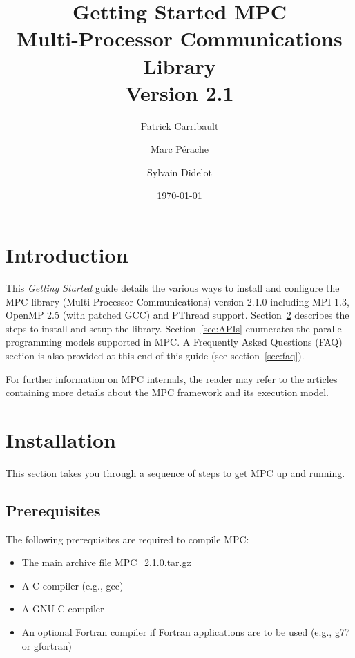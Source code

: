\documentclass[a4paper,11pt]{article}
\title{Getting Started MPC\\Multi-Processor Communications Library\\Version 2.1}
\author{Patrick Carribault \and Marc P\'{e}rache \and Sylvain Didelot}
\date{\today}
\def\MPCVERSION{2.1.0}
\begin{document}
\maketitle
\tableofcontents

\section{Introduction}
This \textit{Getting Started} guide details the various ways to install and configure the MPC library
(Multi-Processor Communications) version {\MPCVERSION} including MPI 1.3, OpenMP 2.5 (with patched GCC) and PThread support.
Section~\ref{sec:installation} describes the steps to install and setup the library.
Section~\ref{sec:APIs} enumerates the parallel-programming models supported in MPC.
A Frequently Asked Questions (FAQ) section is also provided at this end of this guide (see section~\ref{sec:faq}).

For further information on MPC internals, the reader may refer to the
articles~\cite{Perache08,Perache09,Carribault10} containing more details about the MPC
framework and its execution model.

\section{Installation}
\label{sec:installation}

This section takes you through a sequence of steps to get MPC up and running.

\subsection{Prerequisites}

The following prerequisites are required to compile MPC:
\begin{itemize}
    \item  The main archive file MPC\_\MPCVERSION.tar.gz

    \item  A C compiler (e.g., gcc)

    \item  A GNU C compiler

    \item  An optional Fortran compiler if Fortran applications are to be used
      (e.g., g77 or gfortran)
\end{itemize}
\end{document}
